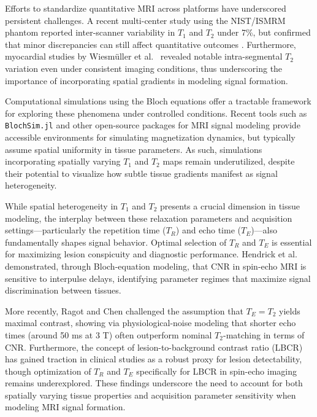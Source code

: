 \documentclass[10pt,a4paper,twoside]{article}
\begin{document}
Efforts to standardize quantitative MRI across platforms have underscored persistent challenges. A recent multi-center study using the NIST/ISMRM phantom reported inter-scanner variability in $ T_1 $ and $ T_2 $ under 7\%, but confirmed that minor discrepancies can still affect quantitative outcomes \cite{pasini2025}. Furthermore, myocardial studies by Wiesmüller et al.\ \cite{wiesmueller2020} revealed notable intra-segmental $ T_2 $ variation even under consistent imaging conditions, thus underscoring the importance of incorporating spatial gradients in modeling signal formation.

Computational simulations using the Bloch equations offer a tractable framework for exploring these phenomena under controlled conditions. Recent tools such as \texttt{BlochSim.jl} \cite{blochsim} and other open-source packages for MRI signal modeling provide accessible environments for simulating magnetization dynamics, but typically assume spatial uniformity in tissue parameters. As such, simulations incorporating spatially varying $ T_1 $ and $ T_2 $ maps remain underutilized, despite their potential to visualize how subtle tissue gradients manifest as signal heterogeneity.

While spatial heterogeneity in $ T_1 $ and $ T_2 $ presents a crucial dimension in tissue modeling, the interplay between these relaxation parameters and acquisition settings—particularly the repetition time ($T_R$) and echo time ($T_E$)—also fundamentally shapes signal behavior. Optimal selection of $T_R$ and $T_E$ is essential for maximizing lesion conspicuity and diagnostic performance. Hendrick et al.\ \cite{hendrick1984} demonstrated, through Bloch-equation modeling, that CNR in spin-echo MRI is sensitive to interpulse delays, identifying parameter regimes that maximize signal discrimination between tissues. 

More recently, Ragot and Chen \cite{ragot2019} challenged the assumption that $ T_E = T_2 $ yields maximal contrast, showing via physiological-noise modeling that shorter echo times (around 50 ms at 3 T) often outperform nominal $ T_2 $-matching in terms of CNR. Furthermore, the concept of lesion-to-background contrast ratio (LBCR) has gained traction in clinical studies as a robust proxy for lesion detectability, though optimization of $T_R$ and $T_E$ specifically for LBCR in spin-echo imaging remains underexplored. These findings underscore the need to account for both spatially varying tissue properties and acquisition parameter sensitivity when modeling MRI signal formation.
\end{document}
